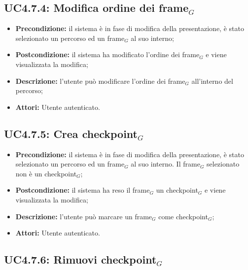 \subsection{ UC4.7.4: Modifica ordine dei frame$_G$}

\begin{itemize}
	\item \textbf{Precondizione:} il sistema è in fase di modifica della presentazione, è stato selezionato un percorso ed un frame$_G$ al suo interno;
	\item \textbf{Postcondizione:} il sistema ha modificato l'ordine dei frame$_G$ e viene visualizzata la modifica;
	\item \textbf{Descrizione:} l'utente può modificare l'ordine dei frame$_G$ all'interno del percorso;
	\item \textbf{Attori:} Utente autenticato.
\end{itemize}
\subsection{ UC4.7.5: Crea checkpoint$_G$}

\begin{itemize}
	\item \textbf{Precondizione:} il sistema è in fase di modifica della presentazione, è stato selezionato un percorso ed un frame$_G$ al suo interno. Il frame$_G$ selezionato non è un checkpoint$_G$;
	\item \textbf{Postcondizione:} il sistema ha reso il frame$_G$ un checkpoint$_G$ e viene visualizzata la modifica;
	\item \textbf{Descrizione:} l'utente può marcare un frame$_G$ come checkpoint$_G$;
	\item \textbf{Attori:} Utente autenticato.
\end{itemize}
\subsection{ UC4.7.6: Rimuovi checkpoint$_G$}

